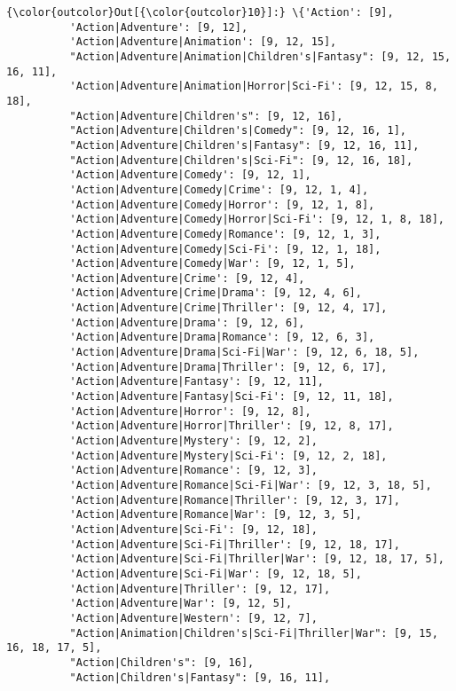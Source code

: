 \documentclass[11pt]{article}
\begin{document}
\begin{Verbatim}[commandchars=\\\{\}]
{\color{outcolor}Out[{\color{outcolor}10}]:} \{'Action': [9],
          'Action|Adventure': [9, 12],
          'Action|Adventure|Animation': [9, 12, 15],
          "Action|Adventure|Animation|Children's|Fantasy": [9, 12, 15, 16, 11],
          'Action|Adventure|Animation|Horror|Sci-Fi': [9, 12, 15, 8, 18],
          "Action|Adventure|Children's": [9, 12, 16],
          "Action|Adventure|Children's|Comedy": [9, 12, 16, 1],
          "Action|Adventure|Children's|Fantasy": [9, 12, 16, 11],
          "Action|Adventure|Children's|Sci-Fi": [9, 12, 16, 18],
          'Action|Adventure|Comedy': [9, 12, 1],
          'Action|Adventure|Comedy|Crime': [9, 12, 1, 4],
          'Action|Adventure|Comedy|Horror': [9, 12, 1, 8],
          'Action|Adventure|Comedy|Horror|Sci-Fi': [9, 12, 1, 8, 18],
          'Action|Adventure|Comedy|Romance': [9, 12, 1, 3],
          'Action|Adventure|Comedy|Sci-Fi': [9, 12, 1, 18],
          'Action|Adventure|Comedy|War': [9, 12, 1, 5],
          'Action|Adventure|Crime': [9, 12, 4],
          'Action|Adventure|Crime|Drama': [9, 12, 4, 6],
          'Action|Adventure|Crime|Thriller': [9, 12, 4, 17],
          'Action|Adventure|Drama': [9, 12, 6],
          'Action|Adventure|Drama|Romance': [9, 12, 6, 3],
          'Action|Adventure|Drama|Sci-Fi|War': [9, 12, 6, 18, 5],
          'Action|Adventure|Drama|Thriller': [9, 12, 6, 17],
          'Action|Adventure|Fantasy': [9, 12, 11],
          'Action|Adventure|Fantasy|Sci-Fi': [9, 12, 11, 18],
          'Action|Adventure|Horror': [9, 12, 8],
          'Action|Adventure|Horror|Thriller': [9, 12, 8, 17],
          'Action|Adventure|Mystery': [9, 12, 2],
          'Action|Adventure|Mystery|Sci-Fi': [9, 12, 2, 18],
          'Action|Adventure|Romance': [9, 12, 3],
          'Action|Adventure|Romance|Sci-Fi|War': [9, 12, 3, 18, 5],
          'Action|Adventure|Romance|Thriller': [9, 12, 3, 17],
          'Action|Adventure|Romance|War': [9, 12, 3, 5],
          'Action|Adventure|Sci-Fi': [9, 12, 18],
          'Action|Adventure|Sci-Fi|Thriller': [9, 12, 18, 17],
          'Action|Adventure|Sci-Fi|Thriller|War': [9, 12, 18, 17, 5],
          'Action|Adventure|Sci-Fi|War': [9, 12, 18, 5],
          'Action|Adventure|Thriller': [9, 12, 17],
          'Action|Adventure|War': [9, 12, 5],
          'Action|Adventure|Western': [9, 12, 7],
          "Action|Animation|Children's|Sci-Fi|Thriller|War": [9, 15, 16, 18, 17, 5],
          "Action|Children's": [9, 16],
          "Action|Children's|Fantasy": [9, 16, 11],

\end{Verbatim}
\end{document}
